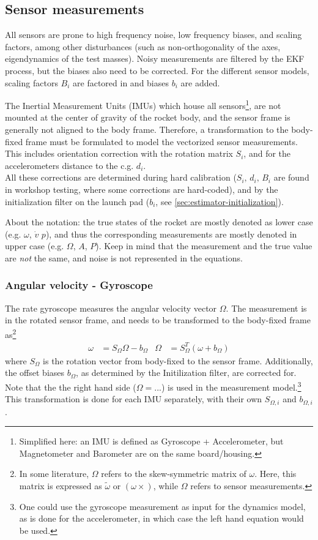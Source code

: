 \subsection{Sensor measurements}
\label{sec:model-measurements}
All sensors are prone to high frequency noise, low frequency biases, and scaling factors, among other disturbances (such as non-orthogonality of the axes, eigendynamics of the test masses).
Noisy measurements are filtered by the EKF process, but the biases also need to be corrected.
For the different sensor models, scaling factors $B_i$ are factored in and biases $b_i$ are added. 

The Inertial Measurement Units (IMUs) which house all sensors\footnote{Simplified here: an IMU is defined as Gyroscope + Accelerometer, but Magnetometer and Barometer are on the same board/housing.}, are not mounted at the center of gravity of the rocket body, and the sensor frame is generally not aligned to the body frame.
Therefore, a transformation to the body-fixed frame must be formulated to model the vectorized sensor measurements.
This includes orientation correction with the rotation matrix $S_i$, and for the accelerometers distance to the c.g. $d_i$. \\
All these corrections are determined during hard calibration ($S_i, \, d_i, \, B_i$ are found in workshop testing, where some corrections are hard-coded), and by the initialization filter on the launch pad ($b_i$, see \autoref{sec:estimator-initialization}).

About the notation: the true states of the rocket are mostly denoted as lower case (e.g. $\omega$, $\dot v$ $p$), and thus the corresponding measurements are mostly denoted in upper case (e.g. $\Omega$, $A$, $P$).  
Keep in mind that the measurement and the true value are \textit{not} the same, and noise is not represented in the equations.


\subsubsection{Angular velocity - Gyroscope}
The rate gyroscope measures the angular velocity vector $\Omega$. 
The measurement is in the rotated sensor frame, and needs to be transformed to the  body-fixed frame as\footnote{In some literature, $\Omega$ refers to the skew-symmetric matrix of $\omega$. Here, this matrix is expressed as $\tilde \omega$ or $(\omega \times)$, while $\Omega$ refers to sensor measurements.}
\begin{align}
    \omega &= S_\Omega \Omega - b_\Omega
    &
    \Omega &= S_\Omega^T (\omega + b_\Omega)
    \label{eq:meas-gyro}
\end{align}
where $S_\Omega$ is the rotation vector from body-fixed to the sensor frame.
Additionally, the offset biases $b_\Omega$, as determined by the Initilization filter, are corrected for.
Note that the the right hand side ($\Omega = ...$) is used in the measurement model.\footnote{One could use the gyroscope measurement as input for the dynamics model, as is done for the accelerometer, in which case the left hand equation would be used.}
This transformation is done for each IMU separately, with their own $S_{\Omega, i}$ and $b_{\Omega, i}$.


